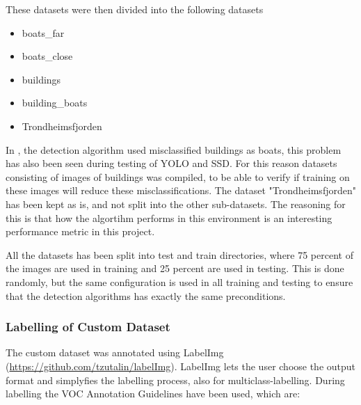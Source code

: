 \newpage

These datasets were then divided into the following datasets

\begin{itemize}
    \item boats\_far
    \item boats\_close
    \item buildings
    \item building\_boats
    \item Trondheimsfjorden
\end{itemize}

In \citep{Tangstad2017}, the detection algorithm used misclassified buildings as boats, this problem has also been seen during testing of YOLO and SSD. For this reason datasets consisting of images of buildings was compiled, to be able to verify if training on these images will reduce these misclassifications. The dataset "Trondheimsfjorden" has been kept as is, and not split into the other sub-datasets. The reasoning for this is that how the algortihm performs in this environment is an interesting performance metric in this project. 

\vspace{3mm}

All the datasets has been split into test and train directories, where 75 percent of the images are used in training and 25 percent are used in testing. This is done randomly, but the same configuration is used in all training and testing to ensure that the detection algorithms has exactly the same preconditions.

\subsubsection{Labelling of Custom Dataset}
The custom dataset was annotated using LabelImg (\url{https://github.com/tzutalin/labelImg}). LabelImg lets the user choose the output format and simplyfies the labelling process, also for multiclass-labelling. During labelling the VOC Annotation Guidelines \citep{Everingham2012} have been used, which are:

